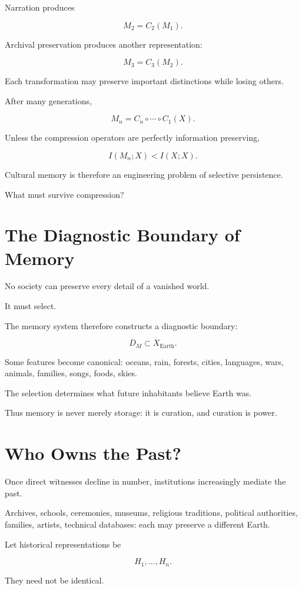 \documentclass[11pt,oneside]{book}
\theoremstyle{definition}
\theoremstyle{remark}
\begin{document}
Narration produces

\[
M_2=C_2(M_1).
\]

Archival preservation produces another representation:

\[
M_3=C_3(M_2).
\]

Each transformation may preserve important distinctions while losing others.

After many generations,

\[
M_n
=
C_n\circ\cdots\circ C_1(X).
\]

Unless the compression operators are perfectly information preserving,

\[
I(M_n;X)
<
I(X;X).
\]

Cultural memory is therefore an engineering problem of selective persistence.

What must survive compression?

\section{The Diagnostic Boundary of Memory}

No society can preserve every detail of a vanished world.

It must select.

The memory system therefore constructs a diagnostic boundary:

\[
D_M
\subset
X_{\mathrm{Earth}}.
\]

Some features become canonical: oceans, rain, forests, cities, languages, wars, animals, families, songs, foods, skies.

The selection determines what future inhabitants believe Earth was.

Thus memory is never merely storage: it is curation, and curation is power.

\section{Who Owns the Past?}

Once direct witnesses decline in number, institutions increasingly mediate the past.

Archives, schools, ceremonies, museums, religious traditions, political authorities, families, artists, technical databases: each may preserve a different Earth.

Let historical representations be

\[
H_1,\ldots,H_n.
\]

They need not be identical.
\end{document}
